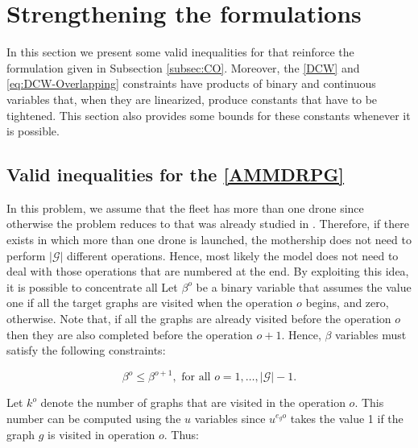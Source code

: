 \section{Strengthening the formulations}\label{bounds} %
\noindent
In this section\CV{,} we present some valid inequalities for \CV{\eqref{AMMDRPG}} that reinforce the formulation given in Subsection \ref{subsec:CO}. Moreover, the \eqref{DCW} and \eqref{eq:DCW-Overlapping} constraints have products of binary and continuous variables that, when they are linearized, produce  constants that have to be tightened. This section also provides some bounds for these constants whenever it is possible. 



\subsection{Valid inequalities for the \ref{AMMDRPG}}
\noindent
In this problem, we assume that the fleet has more than one drone since otherwise the problem reduces to  that was already studied in \cite{art:Amorosi2021}. Therefore, if there exists  in which more than one drone is launched, the mothership does not need to perform $|\mathcal G|$ different operations. Hence, most likely the model does not need to deal with those operations that are numbered at the end. By exploiting this idea, it is possible to concentrate all 
\noindent
Let $\beta^o$ be a binary variable that assumes the value one if all the target graphs are visited when the operation $o$ begins, and zero, otherwise. Note that, if all the graphs are already visited before the operation $o$ then they are also completed before the operation $o+1$. Hence, $\beta$ variables must satisfy the following constraints:

\begin{equation}\tag{Monotonicity}\label{eq:Monotonicity}
\beta^o \leq \beta^{o+1}, \mbox{ for all } o=1,\ldots, |\mathcal{G}|-1.
\end{equation}

\noindent
Let $k^o$ denote the number of graphs that are visited in the operation $o$. This number can be computed using the $u$ variables since $u^{e_go}$ takes the value 1 if the graph $g$ is visited in operation $o$. Thus:

